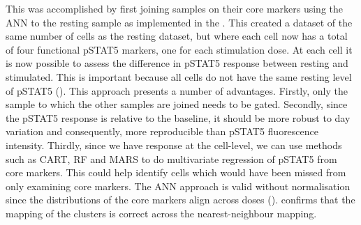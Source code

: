 This was accomplished by first joining samples on their core markers using the \gls{ANN} to the resting sample \citep{Jones:2011ez}
as implemented in the .
This created a dataset of the same number of cells as the resting dataset, but where each cell now has a total of four functional pSTAT5 markers,
one for each stimulation dose.
At each cell it is now possible to assess the difference in pSTAT5 response between resting and stimulated.
This is important because all cells do not have the same resting level of pSTAT5 ().
This approach presents a number of advantages.
Firstly, only the sample to which the other samples are joined needs to be gated.
Secondly, since the pSTAT5 response is relative to the baseline, it should be more robust to day variation
and consequently, more reproducible than pSTAT5 fluorescence intensity.
Thirdly, since we have response at the cell-level, we can use methods
such as \gls{CART}, \gls{RF} and \gls{MARS} to do multivariate regression of pSTAT5 from core markers.
This could help identify cells which would have been missed from only examining core markers.
The \gls{ANN} approach is valid without normalisation since the distributions of the core markers align across doses ().
 confirms that the mapping of the clusters is correct across the nearest-neighbour mapping.
